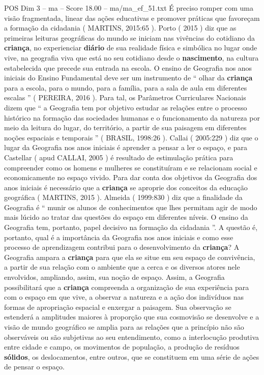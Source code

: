 \begin{textsample}{POS Dim 3 – ma – Score 18.00 – ma/ma\_ef\_51.txt}
É preciso romper com uma visão fragmentada, linear das ações educativas e promover práticas que favoreçam a formação da cidadania ( MARTINS, 2015:65 ).
Porto ( 2015 ) diz que as primeiras leituras geográficas do mundo se iniciam nas vivências do cotidiano da \textbf{criança}, no experienciar \textbf{diário} de sua realidade física e simbólica no lugar onde vive, na geografia viva que está no seu cotidiano desde o \textbf{nascimento}, na cultura estabelecida que precede sua entrada na escola.
O ensino de Geografia nos anos iniciais do Ensino Fundamental deve ser um instrumento de “ olhar da \textbf{criança} para a escola, para o mundo, para a família, para a sala de aula em diferentes escalas ” ( PEREIRA, 2016 ).
Para tal, os Parâmetros Curriculares Nacionais dizem que “ a Geografia tem por objetivo estudar as relações entre o processo histórico na formação das sociedades humanas e o funcionamento da natureza por meio da leitura do lugar, do território, a partir de sua paisagem em diferentes noções espaciais e temporais ” ( BRASIL, 1998:26 ).
Callai ( 2005:229 ) diz que o lugar da Geografia nos anos iniciais é aprender a pensar a ler o espaço, e para Castellar ( apud CALLAI, 2005 ) é resultado de estimulação prática para compreender como os homens e mulheres se constituíram e se relacionam social e economicamente no espaço vivido.
Para dar conta dos objetivos da Geografia dos anos iniciais é necessário que a \textbf{criança} se aproprie dos conceitos da educação geográfica ( MARTINS, 2015 ).
Almeida ( 1999:830 ) diz que a finalidade da Geografia é “ munir os alunos de conhecimentos que lhes permitam agir de modo mais lúcido ao tratar das questões do espaço em diferentes níveis.
O ensino da Geografia tem, portanto, papel decisivo na formação da cidadania ”.
A questão é, portanto, qual é a importância da Geografia nos anos iniciais e como esse processo de aprendizagem contribui para o desenvolvimento da \textbf{criança}?
A Geografia ampara a \textbf{criança} para que ela se situe em seu espaço de convivência, a partir de sua relação com o ambiente que a cerca e os diversos atores nele envolvidos, ampliando, assim, sua noção de espaço.
Assim, a Geografia possibilitará que a \textbf{criança} compreenda a organização de sua experiência para com o espaço em que vive, a observar a natureza e a ação dos indivíduos nas formas de apropriação espacial e enxergar a paisagem.
Sua observação se estenderá a amplitudes maiores à proporção que sua cosmovisão se desenvolve e a visão de mundo geográfico se amplia para as relações que a princípio não são observáveis ou são subjetivas ao seu entendimento, como a interlocução produtiva entre cidade e campo, os movimentos de população, a produção de resíduos \textbf{sólidos}, os deslocamentos, entre outros, que se constituem em uma série de ações de pensar o espaço.

\end{textsample}
